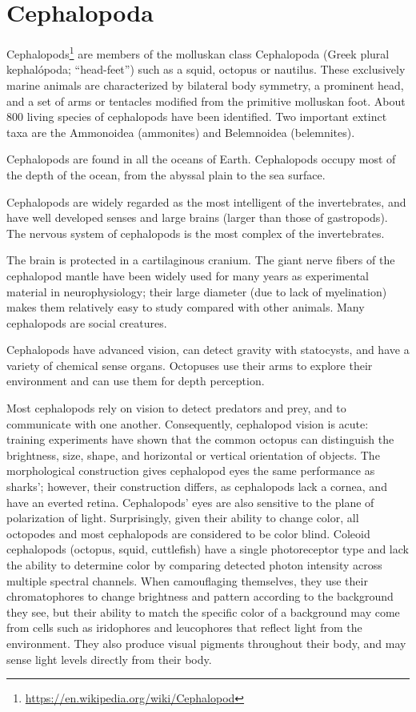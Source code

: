 \documentclass[]{book}
\let\rmarkdownfootnote\footnote%
\def\footnote{\protect\rmarkdownfootnote}
\renewcommand{\href}[2]{#2\footnote{\url{#1}}}
\theoremstyle{definition}
\theoremstyle{definition}
\theoremstyle{definition}
\theoremstyle{remark}
\begin{document}
\section{Cephalopoda}\label{cephalopoda}

\href{https://en.wikipedia.org/wiki/Cephalopod}{Cephalopods} are members
of the molluskan class Cephalopoda (Greek plural kephalópoda;
``head-feet'') such as a squid, octopus or nautilus. These exclusively
marine animals are characterized by bilateral body symmetry, a prominent
head, and a set of arms or tentacles modified from the primitive
molluskan foot. About 800 living species of cephalopods have been
identified. Two important extinct taxa are the Ammonoidea (ammonites)
and Belemnoidea (belemnites).

Cephalopods are found in all the oceans of Earth. Cephalopods occupy
most of the depth of the ocean, from the abyssal plain to the sea
surface.

Cephalopods are widely regarded as the most intelligent of the
invertebrates, and have well developed senses and large brains (larger
than those of gastropods). The nervous system of cephalopods is the most
complex of the invertebrates.

The brain is protected in a cartilaginous cranium. The giant nerve
fibers of the cephalopod mantle have been widely used for many years as
experimental material in neurophysiology; their large diameter (due to
lack of myelination) makes them relatively easy to study compared with
other animals. Many cephalopods are social creatures.

Cephalopods have advanced vision, can detect gravity with statocysts,
and have a variety of chemical sense organs. Octopuses use their arms to
explore their environment and can use them for depth perception.

Most cephalopods rely on vision to detect predators and prey, and to
communicate with one another. Consequently, cephalopod vision is acute:
training experiments have shown that the common octopus can distinguish
the brightness, size, shape, and horizontal or vertical orientation of
objects. The morphological construction gives cephalopod eyes the same
performance as sharks'; however, their construction differs, as
cephalopods lack a cornea, and have an everted retina. Cephalopods' eyes
are also sensitive to the plane of polarization of light. Surprisingly,
given their ability to change color, all octopodes and most cephalopods
are considered to be color blind. Coleoid cephalopods (octopus, squid,
cuttlefish) have a single photoreceptor type and lack the ability to
determine color by comparing detected photon intensity across multiple
spectral channels. When camouflaging themselves, they use their
chromatophores to change brightness and pattern according to the
background they see, but their ability to match the specific color of a
background may come from cells such as iridophores and leucophores that
reflect light from the environment. They also produce visual pigments
throughout their body, and may sense light levels directly from their
body.
\end{document}
